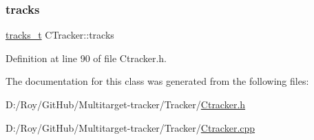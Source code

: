 \subsubsection{\texorpdfstring{tracks}{tracks}}
{\footnotesize\ttfamily \mbox{\hyperlink{track_8h_aaa9881295be74ce8bd6990b9aafaf788}{tracks\+\_\+t}} C\+Tracker\+::tracks}



Definition at line 90 of file Ctracker.\+h.



The documentation for this class was generated from the following files\+:\begin{DoxyCompactItemize}
\item 
D\+:/\+Roy/\+Git\+Hub/\+Multitarget-\/tracker/\+Tracker/\mbox{\hyperlink{_ctracker_8h}{Ctracker.\+h}}\item 
D\+:/\+Roy/\+Git\+Hub/\+Multitarget-\/tracker/\+Tracker/\mbox{\hyperlink{_ctracker_8cpp}{Ctracker.\+cpp}}\end{DoxyCompactItemize}

